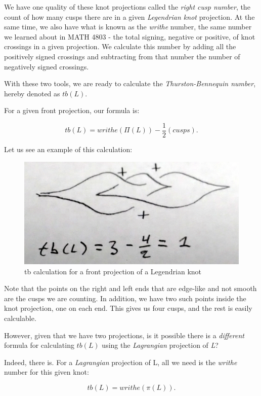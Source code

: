 \documentclass{article}
\begin{document}
We have one quality of these knot projections called the \textit{right cusp number},
the count of how many cusps there are in a given \textit{Legendrian knot} projection.
At the same time, we also have what is known as the \textit{writhe} number, the same
number we learned about in MATH 4803 - the total signing, negative or positive, of knot crossings
in a given projection. We calculate this number by adding all the positively signed crossings
and subtracting from that number the number of negatively signed crossings.

With these two tools, we are ready to calculate the \textit{Thurston-Bennequin number},
hereby denoted as $tb(L).$

For a given front projection, our formula is:

\[tb(L) = writhe(\Pi(L)) - \frac{1}{2}(cusps).\]

Let us see an example of this calculation:

\begin{figure}[h!]
    \includegraphics[width=\linewidth]{tbFront.jpg}
    \caption{tb calculation for a front projection of a Legendrian knot}
    \label{fig:knot1}
\end{figure}

Note that the points on the right and left ends that are edge-like and not smooth are
the cusps we are counting. In addition, we have two such points inside the knot
projection, one on each end. This gives us four cusps, and the rest
is easily calculable.


However, given that we have two projections,
is it possible there is a \textit{different} formula for calculating $tb(L)$ using
the \textit{Lagrangian} projection of \textit{L}?

Indeed, there is. For a \textit{Lagrangian} projection of L, all we need is the
\textit{writhe} number for this given knot:

\[tb(L) = writhe(\pi(L)).\]
\end{document}
